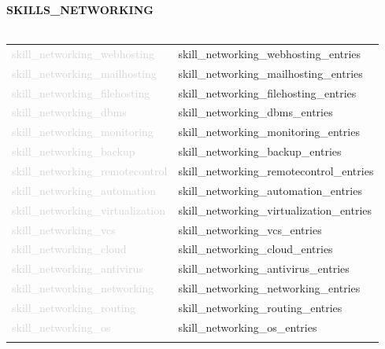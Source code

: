 \documentclass{article}
\begin{document}
\textbf{\textcolor{deepblue}{\uppercase{{{skills_networking}}}}} \\\\ \hfill
\begin{tabular}{ R{4cm} L{11cm} }
	\textcolor{lightgray}{{{skill_networking_webhosting}}} & {{skill_networking_webhosting_entries}} \\ \hfill
	\textcolor{lightgray}{{{skill_networking_mailhosting}}} & {{skill_networking_mailhosting_entries}} \\ \hfill
	\textcolor{lightgray}{{{skill_networking_filehosting}}} & {{skill_networking_filehosting_entries}} \\ \hfill
	\textcolor{lightgray}{{{skill_networking_dbms}}} & {{skill_networking_dbms_entries}} \\ \hfill
	\textcolor{lightgray}{{{skill_networking_monitoring}}} & {{skill_networking_monitoring_entries}} \\ \hfill
	\textcolor{lightgray}{{{skill_networking_backup}}} & {{skill_networking_backup_entries}} \\ \hfill
	\textcolor{lightgray}{{{skill_networking_remotecontrol}}} & {{skill_networking_remotecontrol_entries}} \\ \hfill
	\textcolor{lightgray}{{{skill_networking_automation}}} & {{skill_networking_automation_entries}} \\ \hfill
	\textcolor{lightgray}{{{skill_networking_virtualization}}} & {{skill_networking_virtualization_entries}} \\ \hfill
	\textcolor{lightgray}{{{skill_networking_vcs}}} & {{skill_networking_vcs_entries}} \\ \hfill
	\textcolor{lightgray}{{{skill_networking_cloud}}} & {{skill_networking_cloud_entries}} \\ \hfill
	\textcolor{lightgray}{{{skill_networking_antivirus}}} & {{skill_networking_antivirus_entries}} \\ \hfill
	\textcolor{lightgray}{{{skill_networking_networking}}} & {{skill_networking_networking_entries}} \\ \hfill
	\textcolor{lightgray}{{{skill_networking_routing}}} & {{skill_networking_routing_entries}} \\ \hfill
	\textcolor{lightgray}{{{skill_networking_os}}} & {{skill_networking_os_entries}} \\ \hfill
\end{tabular}
\end{document}
